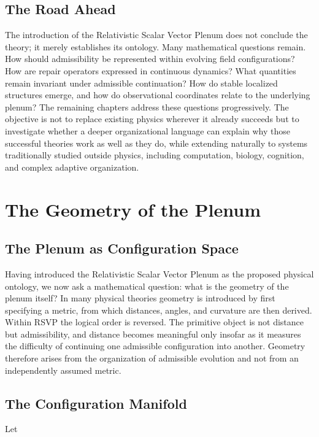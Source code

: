 \documentclass[11pt,oneside]{book}
\numberwithin{equation}{chapter}
\theoremstyle{definition}
\theoremstyle{plain}
\begin{document}
\section{The Road Ahead}

The introduction of the Relativistic Scalar Vector Plenum does not conclude the theory; it merely establishes its ontology. Many mathematical questions remain. How should admissibility be represented within evolving field configurations? How are repair operators expressed in continuous dynamics? What quantities remain invariant under admissible continuation? How do stable localized structures emerge, and how do observational coordinates relate to the underlying plenum? The remaining chapters address these questions progressively. The objective is not to replace existing physics wherever it already succeeds but to investigate whether a deeper organizational language can explain why those successful theories work as well as they do, while extending naturally to systems traditionally studied outside physics, including computation, biology, cognition, and complex adaptive organization.

\chapter{The Geometry of the Plenum}

\section{The Plenum as Configuration Space}

Having introduced the Relativistic Scalar Vector Plenum as the proposed physical ontology, we now ask a mathematical question: what is the geometry of the plenum itself? In many physical theories geometry is introduced by first specifying a metric, from which distances, angles, and curvature are then derived. Within RSVP the logical order is reversed. The primitive object is not distance but admissibility, and distance becomes meaningful only insofar as it measures the difficulty of continuing one admissible configuration into another. Geometry therefore arises from the organization of admissible evolution and not from an independently assumed metric.

\section{The Configuration Manifold}

Let
\end{document}

